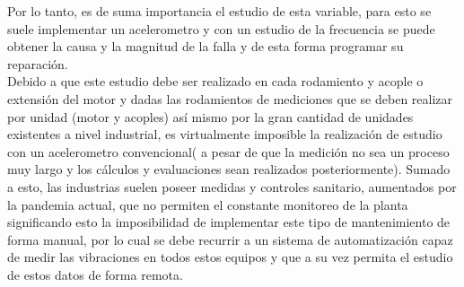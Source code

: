 	Por lo tanto, es de suma importancia el estudio de esta variable, para esto se suele implementar un acelerometro y con un estudio de la frecuencia se puede obtener la causa y la magnitud de la falla y de esta forma programar su reparación.\\
	Debido a que este estudio debe ser realizado en cada rodamiento y acople o extensión del motor y dadas las rodamientos de mediciones que se deben realizar por unidad (motor y acoples) así mismo por la gran cantidad de unidades existentes a nivel industrial, es virtualmente imposible la realización de estudio con un acelerometro convencional( a pesar de que la medición no sea un proceso muy largo y los cálculos y evaluaciones sean realizados posteriormente). Sumado a esto, las industrias suelen poseer medidas y controles sanitario, aumentados por la pandemia actual, que no permiten el constante monitoreo de la planta significando esto la imposibilidad de implementar este tipo de mantenimiento de forma manual, por lo cual se debe recurrir a un sistema de automatización capaz de medir las vibraciones en todos estos equipos y que a su vez permita el estudio de estos datos de forma remota. 

	